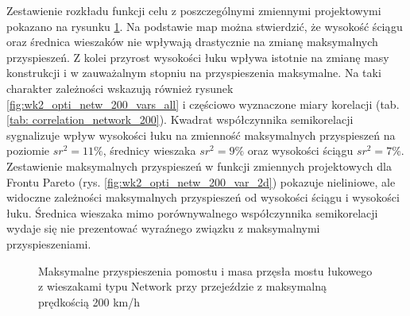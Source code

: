 Zestawienie rozkładu funkcji celu z poszczególnymi zmiennymi projektowymi pokazano na rysunku \ref{fig:wk2_opti_netw_200_variables}. Na podstawie map można stwierdzić, że wysokość ściągu oraz średnica wieszaków nie wpływają drastycznie na zmianę maksymalnych przyspieszeń. Z kolei przyrost wysokości łuku wpływa istotnie na zmianę masy konstrukcji i w zauważalnym stopniu na przyspieszenia maksymalne. Na taki charakter zależności wskazują również rysunek \ref{fig:wk2_opti_netw_200_vars_all} i częściowo wyznaczone miary korelacji (tab. \ref{tab: correlation_network_200}). Kwadrat współczynnika semikorelacji sygnalizuje wpływ wysokości łuku na zmienność maksymalnych przyspieszeń na poziomie $sr^2=11\%$, średnicy wieszaka $sr^2 = 9\%$ oraz wysokości ściągu $sr^2 = 7\%$. Zestawienie maksymalnych przyspieszeń w funkcji zmiennych projektowych dla Frontu Pareto (rys. \ref{fig:wk2_opti_netw_200_var_2d}) pokazuje nieliniowe, ale widoczne zależności maksymalnych przyspieszeń od wysokości ściągu i wysokości łuku. Średnica wieszaka mimo porównywalnego współczynnika semikorelacji wydaje się nie prezentować wyraźnego związku z maksymalnymi przyspieszeniami.



\begin{figure}[hbt!]
	\centering
	\captionsetup{justification=centering}
	\caption{Maksymalne przyspieszenia pomostu i masa przęsła mostu łukowego z wieszakami typu Network przy przejeździe z maksymalną prędkością 200 km/h}
	\label{fig:wk2_opti_netw_200_variables}
\end{figure}

